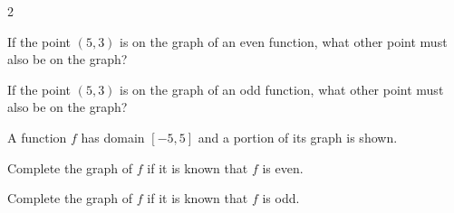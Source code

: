 \documentclass{sebase}
\begin{document}
\begin{multicols}{2}
\begin{ExerciseList}
\item[$\hfill $63.] 

\begin{ExerciseList}
\item[(a)] If the point $(5,3)$ is on the graph of an even function, what
other point must also be on the graph?

%

\item[(b)] If the point $(5,3)$ is on the graph of an odd function, what
other point must also be on the graph?

%
\end{ExerciseList}

%
{}

\item[$\hfill $64.] A function $f$ has domain $[-5,5]$ and a portion of its
graph is shown.

\begin{ExerciseList}
\item[(a)] Complete the graph of $f$ if it is known that $f$ is even.

%

\item[(b)] Complete the graph of $f$ if it is known that $f$ is odd.

%
\end{ExerciseList}
\end{ExerciseList}


\end{multicols}
\end{document}
